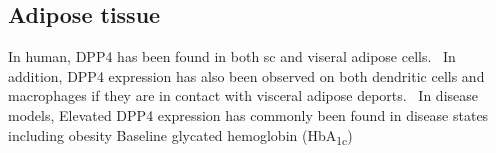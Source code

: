 \subsection{Adipose tissue}
In human, DPP4 has been found in both sc and viseral adipose cells.~\cite{Lamers2011} In addition, DPP4 expression has also been observed on both dendritic cells and macrophages if they are in contact with visceral adipose deports.~\cite{Zhong2013} In disease models, Elevated DPP4 expression has commonly been found in disease states including obesity Baseline glycated hemoglobin (HbA\textsubscript{1c}) 